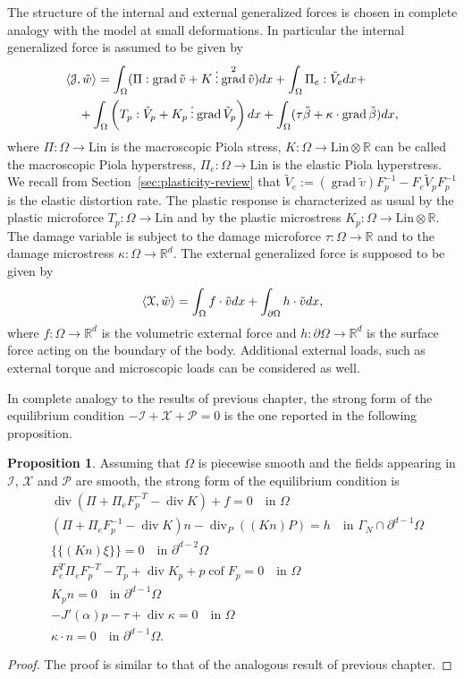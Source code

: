 \documentclass[a4paper,10pt,oneside]{amsbook}
\numberwithin{section}{chapter}
\numberwithin{equation}{chapter}
\theoremstyle{definition}
\newtheorem{prop}{Proposition}[chapter]
\DeclareMathOperator{\cof}{cof}
\DeclareMathOperator{\diver}{div}
\DeclareMathOperator{\grad}{grad}
\DeclarePairedDelimiter{\dual}{\langle}{\rangle}
\newcommand{\threedots}{\mathbin{\vdots}}
\begin{document}
The structure of the internal and external generalized forces is chosen in complete analogy with the model at small deformations. In particular the internal generalized force is assumed to be given by
\[
\begin{multlined}
\dual{\mathcal{J},\tilde w}=\int_\Omega(\Pi:\grad\tilde v+K\threedots\grad^2\tilde v)dx+\int_\Omega \Pi_e:\tilde V_edx+\\
+\int_\Omega\left(T_p:\tilde V_p+K_p\threedots\grad\tilde V_p\right)dx+\int_\Omega(\tau\tilde\beta+\kappa\cdot\grad\tilde\beta)dx,
\end{multlined}
\]
where $\Pi\colon\Omega\to\text{Lin}$ is the macroscopic Piola stress, $K\colon\Omega\to\text{Lin}\otimes\mathbb{R}$ can be called the macroscopic Piola hyperstress, $\Pi_e\colon\Omega\to\text{Lin}$ is the elastic Piola hyperstress. We recall from Section~\ref{sec:plasticity-review} that $\tilde V_e:=(\grad\tilde v)F_p^{-1}-F_e\tilde V_pF_p^{-1}$ is the elastic distortion rate. The plastic response is characterized as usual by the plastic microforce $T_p\colon\Omega\to\text{Lin}$ and by the plastic microstress $K_p\colon\Omega\to\text{Lin}\otimes\mathbb{R}$. The damage variable is subject to the damage microforce $\tau\colon\Omega\to\mathbb{R}$ and to the damage microstress $\kappa\colon\Omega\to\mathbb{R}^d$. The external generalized force is supposed to be given by
\[
\dual{\mathcal{X},\tilde w}=\int_\Omega f\cdot\tilde vdx+\int_{\partial\Omega}h\cdot\tilde vdx,
\]
where $f\colon\Omega\to\mathbb{R}^d$ is the volumetric external force and $h\colon\partial\Omega\to\mathbb{R}^d$ is the surface force acting on the boundary of the body. Additional external loads, such as external torque and microscopic loads can be considered as well.

In complete analogy to the results of previous chapter, the strong form of the equilibrium condition $-\mathcal{I}+\mathcal{X}+\mathcal{P}=0$ is the one reported in the following proposition.
\begin{prop}
\label{prop:strong-form-pressure-large}
Assuming that $\Omega$ is piecewise smooth and the fields appearing in $\mathcal{I}$, $\mathcal{X}$ and $\mathcal{P}$ are smooth, the strong form of the equilibrium condition is
\begin{align*}
&\diver(\Pi+\Pi_eF_p^{-T}-\diver K)+f=0\quad\text{in $\Omega$} \\
&(\Pi+\Pi_eF_p^{-1}-\diver K)n-\diver_P((Kn)P)=h\quad\text{in $\Gamma_N\cap\partial^{d-1}\Omega$} \\
&\{\!\!\{(Kn)\xi\}\!\!\}=0\quad\text{in $\partial^{d-2}\Omega$} \\
&F_e^T\Pi_eF_p^{-T}-T_p+\diver K_p+p\cof F_p=0\quad\text{in $\Omega$} \\
&K_p n=0\quad\text{in $\partial^{d-1}\Omega$} \\
&-J'(\alpha)p-\tau+\diver\kappa=0\quad\text{in $\Omega$} \\
&\kappa\cdot n=0\quad\text{in $\partial^{d-1}\Omega$}.
\end{align*}
\end{prop}
\begin{proof}
The proof is similar to that of the analogous result of previous chapter.
\end{proof}
\end{document}
